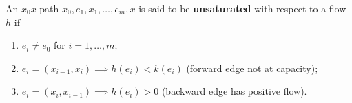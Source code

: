 An $x_0x$-path $x_0, e_1, x_1, \ldots, e_m, x$ is said to be \textbf{unsaturated} with respect to a flow $h$ if

\begin{enumerate}
\item $e_i \neq e_0$ for $i = 1, \ldots, m$;
\item $e_i = (x_{i-1}, x_i) \implies h(e_i) < k(e_i)$ (forward edge not at capacity);
\item $e_i = (x_i, x_{i-1}) \implies h(e_i) > 0$ (backward edge has positive flow).
\end{enumerate}
